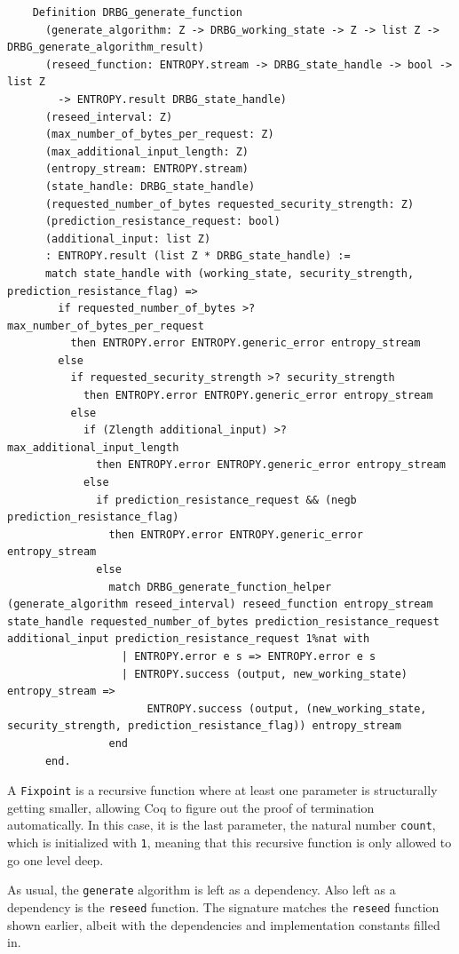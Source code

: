 \documentclass[pageno]{jpaper}
\begin{document}
\begin{lstlisting}
    Definition DRBG_generate_function
      (generate_algorithm: Z -> DRBG_working_state -> Z -> list Z -> DRBG_generate_algorithm_result)
      (reseed_function: ENTROPY.stream -> DRBG_state_handle -> bool -> list Z
        -> ENTROPY.result DRBG_state_handle)
      (reseed_interval: Z)
      (max_number_of_bytes_per_request: Z)
      (max_additional_input_length: Z)
      (entropy_stream: ENTROPY.stream)
      (state_handle: DRBG_state_handle)
      (requested_number_of_bytes requested_security_strength: Z)
      (prediction_resistance_request: bool)
      (additional_input: list Z)
      : ENTROPY.result (list Z * DRBG_state_handle) :=
      match state_handle with (working_state, security_strength, prediction_resistance_flag) =>
        if requested_number_of_bytes >? max_number_of_bytes_per_request
          then ENTROPY.error ENTROPY.generic_error entropy_stream
        else
          if requested_security_strength >? security_strength
            then ENTROPY.error ENTROPY.generic_error entropy_stream
          else
            if (Zlength additional_input) >? max_additional_input_length
              then ENTROPY.error ENTROPY.generic_error entropy_stream
            else
              if prediction_resistance_request && (negb prediction_resistance_flag)
                then ENTROPY.error ENTROPY.generic_error entropy_stream
              else
                match DRBG_generate_function_helper (generate_algorithm reseed_interval) reseed_function entropy_stream state_handle requested_number_of_bytes prediction_resistance_request additional_input prediction_resistance_request 1%nat with
                  | ENTROPY.error e s => ENTROPY.error e s
                  | ENTROPY.success (output, new_working_state) entropy_stream =>
                      ENTROPY.success (output, (new_working_state, security_strength, prediction_resistance_flag)) entropy_stream
                end
      end.
\end{lstlisting}


A \lstinline{Fixpoint} is a recursive function where at least one parameter is structurally getting smaller, allowing Coq to figure out the proof of termination automatically. In this case, it is the last parameter, the natural number \lstinline{count}, which is initialized with \lstinline{1}, meaning that this recursive function is only allowed to go one level deep.

As usual, the \lstinline{generate} algorithm is left as a dependency. Also left as a dependency is the \lstinline{reseed} function. The signature matches the \lstinline{reseed} function shown earlier, albeit with the dependencies and implementation constants filled in.
\end{document}
